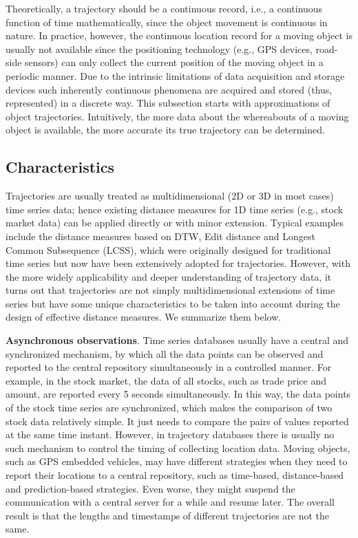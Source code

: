 \documentclass[a4paper, 12pt]{article}
\begin{document}
Theoretically, a trajectory should be a continuous record, i.e., a continuous function of time mathematically, since the object movement is continuous in nature. In practice, however, the continuous location record for a moving object is usually not available since the positioning technology (e.g., GPS devices, road-side sensors) can only collect the current position of the moving object in a periodic manner. Due to the intrinsic limitations of data acquisition and storage devices such inherently continuous phenomena are acquired and stored (thus, represented) in a discrete way. This subsection starts with approximations of object trajectories. Intuitively, the more data about the whereabouts of a moving object is available, the more accurate its true trajectory can be determined.

\subsection{Characteristics}
Trajectories are usually treated as multidimensional (2D or 3D in most cases) time series data; hence existing distance measures for 1D time series (e.g., stock market data) can be applied directly or with minor extension. Typical examples include the distance measures based on DTW, Edit distance and Longest Common Subsequence (LCSS), which were originally designed for traditional time series but now have been extensively adopted for trajectories. However, with the more widely applicability and deeper understanding of trajectory data, it turns out that trajectories are not simply multidimensional extensions of time series but have some unique characteristics to be taken into account during the design of effective distance measures. We summarize them below.

\textbf{Asynchronous observations}. Time series databases usually have a central and synchronized mechanism, by which all the data points can be observed and reported to the central repository simultaneously in a controlled manner. For example, in the stock market, the data of all stocks, such as trade price and amount, are reported every 5 seconds simultaneously. In this way, the data points of the stock time series are synchronized, which makes the comparison of two stock data relatively simple. It just needs to compare the pairs of values reported at the same time instant. However, in trajectory databases there is usually no such mechanism to control the timing of collecting location data. Moving objects, such as GPS embedded vehicles, may have different strategies when they need to report their locations to a central repository, such as time-based, distance-based and prediction-based strategies. Even worse, they might suspend the communication with a central server for a while and resume later. The overall result is that the lengths and timestamps of different trajectories are not the same.
\end{document}
